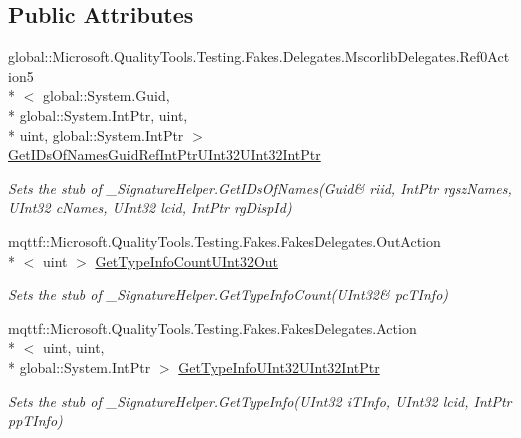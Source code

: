 \subsection*{Public Attributes}
\begin{DoxyCompactItemize}
\item 
global\-::\-Microsoft.\-Quality\-Tools.\-Testing.\-Fakes.\-Delegates.\-Mscorlib\-Delegates.\-Ref0\-Action5\\*
$<$ global\-::\-System.\-Guid, \\*
global\-::\-System.\-Int\-Ptr, uint, \\*
uint, global\-::\-System.\-Int\-Ptr $>$ \hyperlink{class_system_1_1_runtime_1_1_interop_services_1_1_fakes_1_1_stub___signature_helper_aef62e8947b38b174e5744bbd64e6b344}{Get\-I\-Ds\-Of\-Names\-Guid\-Ref\-Int\-Ptr\-U\-Int32\-U\-Int32\-Int\-Ptr}
\begin{DoxyCompactList}\small\item\em Sets the stub of \-\_\-\-Signature\-Helper.\-Get\-I\-Ds\-Of\-Names(Guid\& riid, Int\-Ptr rgsz\-Names, U\-Int32 c\-Names, U\-Int32 lcid, Int\-Ptr rg\-Disp\-Id)\end{DoxyCompactList}\item 
mqttf\-::\-Microsoft.\-Quality\-Tools.\-Testing.\-Fakes.\-Fakes\-Delegates.\-Out\-Action\\*
$<$ uint $>$ \hyperlink{class_system_1_1_runtime_1_1_interop_services_1_1_fakes_1_1_stub___signature_helper_ade24b3b4fde6d4805b34130bb275fd2a}{Get\-Type\-Info\-Count\-U\-Int32\-Out}
\begin{DoxyCompactList}\small\item\em Sets the stub of \-\_\-\-Signature\-Helper.\-Get\-Type\-Info\-Count(U\-Int32\& pc\-T\-Info)\end{DoxyCompactList}\item 
mqttf\-::\-Microsoft.\-Quality\-Tools.\-Testing.\-Fakes.\-Fakes\-Delegates.\-Action\\*
$<$ uint, uint, \\*
global\-::\-System.\-Int\-Ptr $>$ \hyperlink{class_system_1_1_runtime_1_1_interop_services_1_1_fakes_1_1_stub___signature_helper_aa1961cf024485ff096d10b9b2c6e049a}{Get\-Type\-Info\-U\-Int32\-U\-Int32\-Int\-Ptr}
\begin{DoxyCompactList}\small\item\em Sets the stub of \-\_\-\-Signature\-Helper.\-Get\-Type\-Info(\-U\-Int32 i\-T\-Info, U\-Int32 lcid, Int\-Ptr pp\-T\-Info)\end{DoxyCompactList}\item 

\end{DoxyCompactItemize}
